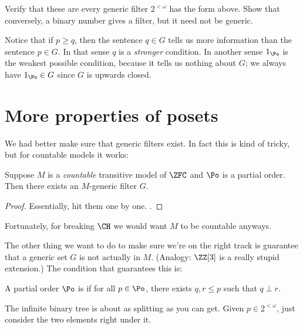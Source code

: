 \begin{exercise}
	Verify that these are every generic filter $2^{<\omega}$ has the form above.
	Show that conversely, a binary number gives a filter, but it need not be generic.
\end{exercise}

Notice that if $p \ge q$, then the sentence $q \in G$ tells us more information than the sentence $p \in G$.
In that sense $q$ is a \emph{stronger} condition.
In another sense $1_\Po$ is the weakest possible condition,
because it tells us nothing about $G$; we always have $1_\Po \in G$
since $G$ is upwards closed.

\section{More properties of posets}
We had better make sure that generic filters exist.
In fact this is kind of tricky, but for countable models it works:
\begin{lemma}
	Suppose $M$ is a \emph{countable} transitive model of $\ZFC$
	and $\Po$ is a partial order.
	Then there exists an $M$-generic filter $G$.
\end{lemma}
\begin{proof}
	Essentially, hit them one by one.
	.
\end{proof}

Fortunately, for breaking $\CH$ we would want $M$ to be countable anyways.

The other thing we want to do to make sure we're on the right track is guarantee
that a generic set $G$ is not actually in $M$.
(Analogy: $\ZZ[3]$ is a really stupid extension.)
The condition that guarantees this is:

\begin{definition}
	A partial order $\Po$ is  if
	for all $p \in \Po$, there exists $q,r \le p$
	such that $q \perp r$.
\end{definition}
\begin{example}
	The infinite binary tree is about as splitting as you can get.
	Given $p \in 2^{<\omega}$, just consider the two elements right under it.
\end{example}

